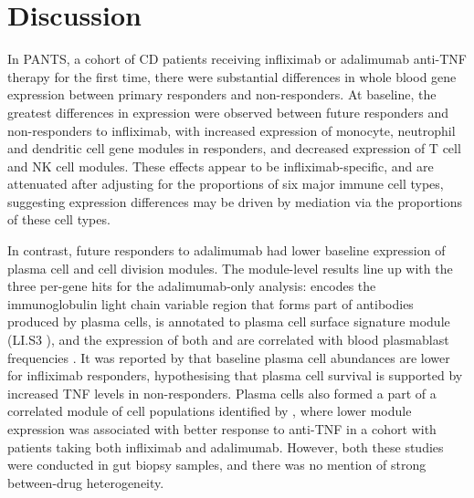 

\section{Discussion}

In \gls{PANTS}, a cohort of \gls{CD} patients receiving infliximab or adalimumab anti-TNF therapy for the first time,
there were substantial differences in whole blood gene expression between primary responders and non-responders.
At baseline, the greatest differences in expression were observed between future responders and non-responders to infliximab,
with increased expression of monocyte, neutrophil and dendritic cell gene modules in responders,
and decreased expression of T cell and NK cell modules.
These effects appear to be infliximab-specific, and are attenuated after adjusting for the proportions of six major immune cell types,
suggesting expression differences may be driven by mediation via the proportions of these cell types.

In contrast, future responders to adalimumab had lower baseline expression of plasma cell and cell division modules.
The module-level results line up with the three per-gene hits for the adalimumab-only analysis:
 encodes the immunoglobulin light chain variable region that forms part of antibodies produced by plasma cells,
 is annotated to plasma cell surface signature module (LI.S3 \autocite{li2013MolecularSignaturesAntibody}), 
and the expression of both  and  are correlated with blood plasmablast frequencies \autocite{tsang2014GlobalAnalysesHuman}.
It was reported by \textcite{gaujoux2019CellcentredMetaanalysisReveals} that baseline plasma cell abundances are lower for infliximab responders,
hypothesising that plasma cell survival is supported by increased \gls{TNF} levels in non-responders.
Plasma cells also formed a part of a correlated module of cell populations identified by \autocite{martin2019SingleCellAnalysisCrohn},
where lower module expression was associated with better response to anti-\gls{TNF} in a cohort with patients taking both infliximab and adalimumab.
However, both these studies were conducted in gut biopsy samples, and there was no mention of strong between-drug heterogeneity.

